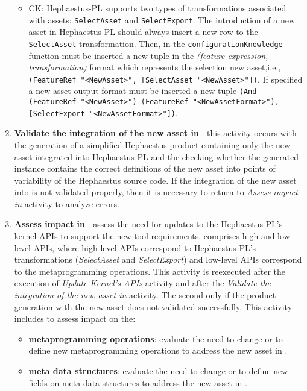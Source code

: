 \begin{enumerate}
\begin{itemize}
\item CK: Hephaestus-PL supports two types of transformations associated with assets: \texttt{SelectAsset} and \texttt{SelectExport}. The introduction of a new asset in Hephaestus-PL should always insert a new row to the \texttt{SelectAsset} transformation. Then, in the \texttt{configurationKnowledge} function must be inserted a new tuple in the \textit{(feature expression, transformation)} format which represents the selection new asset,i.e., \texttt{(FeatureRef "<NewAsset>", [SelectAsset "<NewAsset>"])}.
If specified a new asset output format must be inserted a new tuple \texttt{(And (FeatureRef "<NewAsset>") (FeatureRef "<NewAssetFormat>"), [SelectExport "<NewAssetFormat>"])}.

\end{itemize}  

  \item \textbf{Validate the integration of the new asset in \hpl{}}: this activity occurs with the generation of a simplified Hephaestus product containing only the new asset integrated into Hephaestus-PL and the checking whether the generated instance contains the correct definitions of the new asset into points of variability of the Hephaestus source code. If the integration of the new asset into \hpl{} is not validated properly, then it is necessary to return to \textit{Assess impact in \hpl{}} activity to analyze errors.  
   
  
  \item \textbf{Assess impact in \hpl{}}: assess the need for updates to the Hephaestus-PL's kernel APIs to support the new tool requirements. \hpl{} comprises high and low-level APIs, where high-level APIs correspond to Hephaestus-PL's transformations (\textit{SelectAsset} and \textit{SelectExport}) and low-level APIs correspond to the metaprogramming operations. This activity is reexecuted after the execution of \textit{Update Kernel's APIs} activity and after the \textit{Validate the integration of the new asset in \hpl{}} activity. The second only if the \hpl{} product generation with the new asset does not validated successfully. This activity includes to assess impact on the:
  
\begin{itemize}  
  
  \item \textbf{metaprogramming operations}: evaluate the need to change or to define new metaprogramming operations to address the new asset in \hpl.

  \item \textbf{meta data structures}: evaluate the need to change or to define new fields on meta data structures to address the new asset in \hpl. 
  

\end{itemize}
\end{enumerate}
